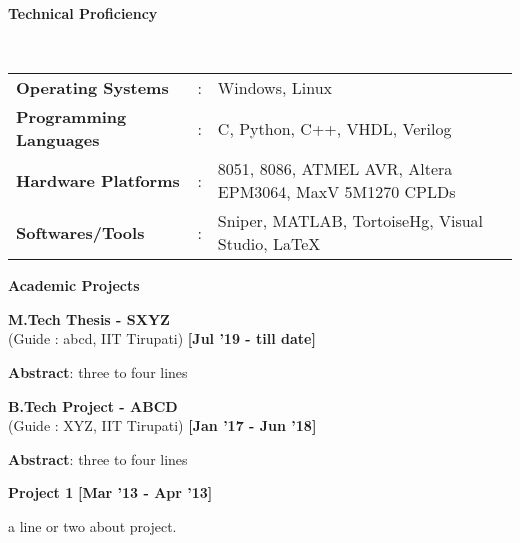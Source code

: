 \documentclass[a4paper,10pt]{article}
\begin{document}
\colorbox{titleColor}{\parbox{6.7in}{\textbf{Technical Proficiency}}}\\

\begin{tabular}{p{1.6in}p{0.1in}p{4.5in}}
  \textbf{\small{Operating Systems}} &: &{{Windows, Linux}} \\

  \textbf{\small{Programming Languages}} &: &{{C, Python, C++, VHDL, Verilog}} \\
  \textbf{\small{Hardware Platforms}} &: &{{8051, 8086, ATMEL AVR, Altera EPM3064, MaxV 5M1270 CPLDs}} \\
  \textbf{\small{Softwares/Tools}} &: &{{Sniper, MATLAB, TortoiseHg, Visual Studio, \LaTeX}} \\
\end{tabular}


\colorbox{titleColor}{\parbox{6.7in}{\textbf{Academic Projects}}}
\begin{itemize*}
  \setlength{\itemsep}{1pt}
  \item \textbf{M.Tech Thesis - SXYZ}  \\
{(Guide : abcd, IIT Tirupati)} \hfill {\small{{\textbf{[Jul '19 - till date]}}\/}}
\begin{itemize*}
  \setlength{\itemsep}{.00pt}
      \item \textbf{Abstract}: three to four lines
\end{itemize*}
\end{itemize*}

\begin{itemize*}
  \setlength{\itemsep}{1pt}
  \item \textbf{B.Tech Project - ABCD} \\
{(Guide : XYZ, IIT Tirupati)}  \hfill {\small{{\textbf{[Jan '17 - Jun '18]}}\/}}
\begin{itemize*}

  \setlength{\itemsep}{.00pt}
      \item \textbf{Abstract}: three to four lines
\end{itemize*}
\end{itemize*}


\begin{itemize*}
  \setlength{\itemsep}{1pt}
  \item \textbf{\small{Project 1}} \hfill {\small{{\textbf{[Mar '13 - Apr '13]}}}\/}
\begin{itemize*}
	\item a line or two about project.
\end{itemize*}
\end{itemize*}
\end{document}
